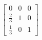 \[
  \left[
  \begin{array}{ccc}
	  0 & 0 & 0 \\
	  \frac{2}{3} & 1 & 0 \\
	  \frac{1}{3} & 0 & 1
  \end{array}
  \right]
  \]